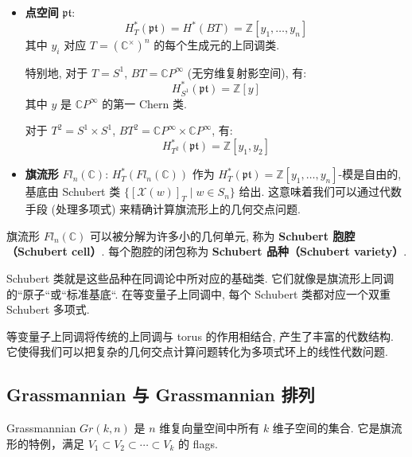 \begin{Example}[等变上同调的例子]
\label{ex:EquivariantCohomology}
\begin{itemize}
\item \textbf{点空间} $\mathfrak{pt}$:
$$H_T^*(\mathfrak{pt}) = H^*(BT) = \mathbb{Z}[y_1, \ldots, y_n]$$
其中 $y_i$ 对应 $T = (\mathbb{C}^\times)^n$ 的每个生成元的上同调类.

特别地, 对于 $T = S^1$, $BT = \mathbb{C}P^\infty$ (无穷维复射影空间), 有:
$$H_{S^1}^*(\mathfrak{pt}) = \mathbb{Z}[y]$$
其中 $y$ 是 $\mathbb{C}P^\infty$ 的第一 Chern 类.

对于 $T^2 = S^1 \times S^1$, $BT^2 = \mathbb{C}P^\infty \times \mathbb{C}P^\infty$, 有:
$$H_{T^2}^*(\mathfrak{pt}) = \mathbb{Z}[y_1, y_2]$$

\item \textbf{旗流形} $Fl_n(\mathbb{C})$: $H_T^*(Fl_n(\mathbb{C}))$ 作为 $H_T^*(\mathfrak{pt}) = \mathbb{Z}[y_1, \ldots, y_n]$-模是自由的, 基底由 Schubert 类 $\{[\mathcal{X}(w)]_T \mid w \in S_n\}$ 给出. 这意味着我们可以通过代数手段 (处理多项式) 来精确计算旗流形上的几何交点问题.
\end{itemize}
\end{Example}

\begin{Definition}
\label{def:SchubertClass}
旗流形 $Fl_n(\mathbb{C})$ 可以被分解为许多小的几何单元, 称为 \textbf{Schubert 胞腔（Schubert cell）}. 每个胞腔的闭包称为 \textbf{Schubert 品种（Schubert variety）}.

Schubert 类就是这些品种在同调论中所对应的基础类. 它们就像是旗流形上同调的``原子``或``标准基底``. 在等变量子上同调中, 每个 Schubert 类都对应一个双重 Schubert 多项式.
\end{Definition}

等变量子上同调将传统的上同调与 torus 的作用相结合, 产生了丰富的代数结构. 它使得我们可以把复杂的几何交点计算问题转化为多项式环上的线性代数问题.

\subsection{Grassmannian 与 Grassmannian 排列}

\begin{Definition}[Grassmannian]
\label{def:Grassmannian}
Grassmannian $Gr(k, n)$ 是 $n$ 维复向量空间中所有 $k$ 维子空间的集合. 它是旗流形的特例，满足 $V_1 \subset V_2 \subset \cdots \subset V_k$ 的 flags.
\end{Definition}

